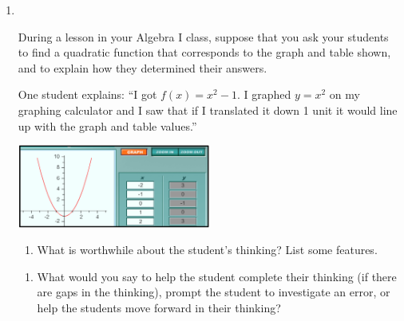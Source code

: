 \documentclass[10pt]{article}
\begin{document}
\begin{enumerate}
\item %
$\;$ \\ 

\vspace*{-8.5pt}
\begin{minipage}{3.5in}\raggedright \parskip4pt
During a lesson in your Algebra I class, suppose that you ask your students to find a quadratic function that corresponds to the graph and table shown, and to explain how they determined their answers.  
 

One student explains: ``I got $f(x)=x^2-1$. I graphed $y=x^2$ on my graphing calculator and I saw that if I translated it down 1 unit it would line up with the graph and table values.''
\end{minipage}
\begin{minipage}{2.6in}
\includegraphics[width=2.5in]{Carlies_Graphic.png}
\end{minipage}

	
	\begin{enumerate}
	\item What is worthwhile about the student's thinking? List some features.
	\end{enumerate}
	
		\vspace*{-12pt}\begin{mdframed} \vspace*{1.75in} \end{mdframed}
		
	\vspace*{-12pt}
	\begin{enumerate}[resume]
	\item What would you say to help the student complete their thinking (if there are gaps in the thinking), prompt the student to investigate an error, or help the students move forward in their thinking?
	\end{enumerate}
	
		\vspace*{-12pt}\begin{mdframed} \vspace*{1.75in} \end{mdframed}\vspace*{-4pt}
	\begin{enumerate}[resume]


\end{enumerate}
\end{enumerate}
\end{document}
